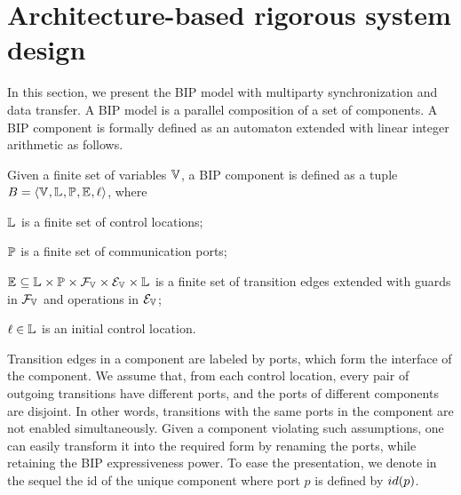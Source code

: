 
\section{Architecture-based rigorous system design}
\label{sec:rsd}


In this section, we present the BIP model with multiparty synchronization and data transfer.
%
%
A BIP model is a parallel composition of a set of components.
A BIP component is formally defined as an automaton extended with linear integer arithmetic as follows.

\begin{definition} 
\label{component-def}
Given a finite set of variables $\mathbb{V}_{}$, a BIP component is defined as a tuple
 $B_{} = \langle{\ensuremath{\mathbb{V}_{}}, \ensuremath{\mathbb{L}_{}}, \ensuremath{\mathbb{P}_{}}, \ensuremath{\mathbb{E}_{}}, \ell}\rangle$, where
\begin{inparaenum}
\item $\mathbb{L}_{}$ is a finite set of control locations;
\item $\mathbb{P}_{}$ is a finite set of communication ports;
\item $\mathbb{E}_{} \subseteq \mathbb{L}_{} \times \mathbb{P}_{} \times \mathcal{F}_{\mathbb{V}_{}} \times \mathcal{E}_{\mathbb{V}_{}} \times \mathbb{L}_{}$
 is a finite set of transition edges extended with guards in $\mathcal{F}_{\mathbb{V}_{}}$
 and operations in $\mathcal{E}_{\mathbb{V}_{}}$;
\item $\ell \in \mathbb{L}_{}$ is an initial control location.
\end{inparaenum}
\end{definition}


Transition edges in a component are labeled by ports, which form the interface of the component.
 We assume that, from each control location,
 every pair of outgoing transitions have different ports,
 and the ports of different components are disjoint.
 In other words, transitions with the same ports in the component are not enabled simultaneously.
 Given a component violating such assumptions,
 one can easily transform it into the required form by renaming the ports,
 while retaining the BIP expressiveness power.
 To ease the presentation, we denote in the sequel the id of the unique component
 where port $p$ is defined by ${id({p})}$.

%


